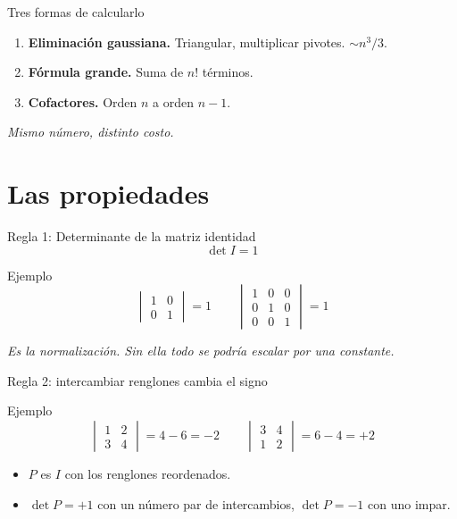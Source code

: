 \documentclass[aspectratio=169,11pt]{beamer}
\newcommand{\dt}[1]{\det #1}
\newcommand{\dbar}[1]{%
  \begin{vmatrix} #1 \end{vmatrix}%
}
\newcommand{\remate}[1]{%
  \vspace{0.3em}
  \begin{center}\itshape\small #1\end{center}%
}
\begin{document}
\begin{frame}{Tres formas de calcularlo}
  \begin{enumerate}
    \item \textbf{Eliminación gaussiana.} Triangular, multiplicar
          pivotes. $\sim n^3/3$.
    \item \textbf{Fórmula grande.} Suma de $n!$ términos.
    \item \textbf{Cofactores.} Orden $n$ a orden $n-1$.
  \end{enumerate}

  \remate{Mismo número, distinto costo.}
\end{frame}

\section{Las propiedades}

\begin{frame}{Regla 1: Determinante de la matriz identidad}
  \[
    \dt{I} = 1
  \]

  \begin{block}{Ejemplo}
    \[
      \dbar{1 & 0 \\ 0 & 1} = 1
      \qquad
      \dbar{1 & 0 & 0 \\ 0 & 1 & 0 \\ 0 & 0 & 1} = 1
    \]
  \end{block}

  \remate{Es la normalización. Sin ella todo se podría
          escalar por una constante.}
\end{frame}

\begin{frame}{Regla 2: intercambiar renglones cambia el signo}
  \begin{block}{Ejemplo}
    \[
      \dbar{1 & 2 \\ 3 & 4} = 4 - 6 = -2
      \qquad
      \dbar{3 & 4 \\ 1 & 2} = 6 - 4 = +2
    \]
  \end{block}

  \begin{itemize}
    \item $P$ es $I$ con los renglones reordenados.
    \item $\dt{P} = +1$ con un número par de intercambios,
          $\dt{P} = -1$ con uno impar.
  \end{itemize}
\end{frame}
\end{document}

